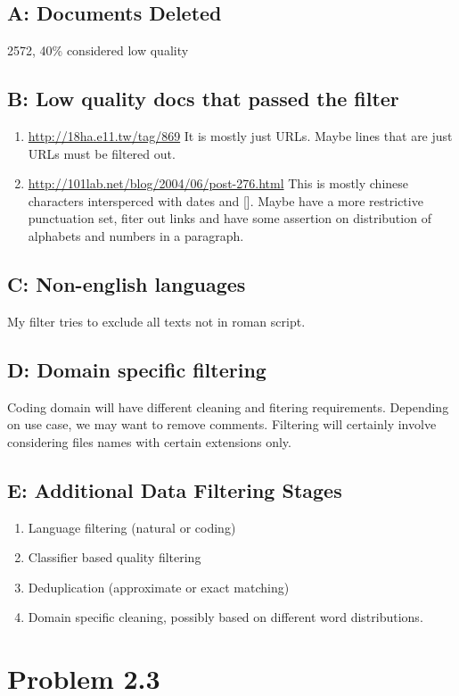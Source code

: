 \documentclass[11pt]{article}
\begin{document}
\subsection{A: Documents Deleted}
\label{sec:org1b48f74}
2572, 40\% considered low quality
\subsection{B: Low quality docs that passed the filter}
\label{sec:org654531d}
\begin{enumerate}
\item \url{http://18ha.e11.tw/tag/869}
It is mostly just URLs. Maybe lines that are just URLs must be filtered out.
\item \url{http://101lab.net/blog/2004/06/post-276.html}
This is mostly chinese characters intersperced with dates and []. Maybe have a more restrictive punctuation set, fiter out links and have some assertion on distribution of alphabets and numbers in a paragraph.
\end{enumerate}
\subsection{C: Non-english languages}
\label{sec:orgb7a02f2}
My filter tries to exclude all texts not in roman script.
\subsection{D: Domain specific filtering}
\label{sec:orge625a44}
Coding domain will have different cleaning and fitering requirements. Depending on use case, we may want to remove comments. Filtering will certainly involve considering files names with certain extensions only.
\subsection{E: Additional Data Filtering Stages}
\label{sec:org39c42ae}
\begin{enumerate}
\item Language filtering (natural or coding)
\item Classifier based quality filtering
\item Deduplication (approximate or exact matching)
\item Domain specific cleaning, possibly based on different word distributions.
\end{enumerate}
\section{Problem 2.3}
\label{sec:orga90522c}
\end{document}
